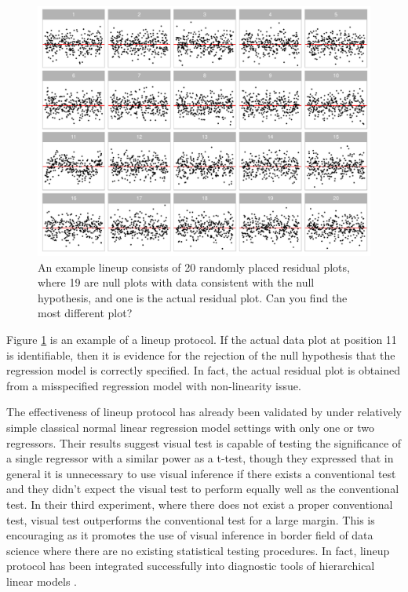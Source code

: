 \documentclass[]{interact}
\theoremstyle{plain}%
\theoremstyle{definition}
\theoremstyle{remark}
\begin{document}
\begin{figure}
\includegraphics[width=1\linewidth]{paper_comparison_files/figure-latex/first-example-lineup-1} \caption{An example lineup consists of 20 randomly placed residual plots, where 19 are null plots with data consistent with the null hypothesis, and one is the actual residual plot. Can you find the most different plot?}\label{fig:first-example-lineup}
\end{figure}

Figure \ref{fig:first-example-lineup} is an example of a lineup
protocol. If the actual data plot at position 11 is identifiable, then
it is evidence for the rejection of the null hypothesis that the
regression model is correctly specified. In fact, the actual residual
plot is obtained from a misspecified regression model with non-linearity
issue.

The effectiveness of lineup protocol has already been validated by
\citet{majumder_validation_2013} under relatively simple classical
normal linear regression model settings with only one or two regressors.
Their results suggest visual test is capable of testing the significance
of a single regressor with a similar power as a t-test, though they
expressed that in general it is unnecessary to use visual inference if
there exists a conventional test and they didn't expect the visual test
to perform equally well as the conventional test. In their third
experiment, where there does not exist a proper conventional test,
visual test outperforms the conventional test for a large margin. This
is encouraging as it promotes the use of visual inference in border
field of data science where there are no existing statistical testing
procedures. In fact, lineup protocol has been integrated successfully
into diagnostic tools of hierarchical linear models
\citep{loy2013diagnostic}.
\end{document}
